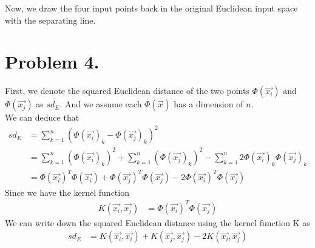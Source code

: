 \documentclass{article}
\begin{document}
    Now, we draw the four input points back in the original Euclidean input space with the separating line.
    \begin{center}
    \end{center}

    \newpage
    \section*{Problem 4.}
    First, we denote the squared Euclidean distance of the two points $\Phi(\overset{\to}{x_i})$ and 
    $\Phi(\overset{\to}{x_j})$ as $sd_E$. And we assume each $\Phi(\overset{\to}{x})$ has a dimension 
    of $n$.\\
    We can deduce that 
    \begin{align*}
        sd_E &= \sum_{k = 1}^{n} (\Phi(\overset{\to}{x_i})_k - \Phi(\overset{\to}{x_j})_k)^2\\
        &= \sum_{k = 1}^{n} (\Phi(\overset{\to}{x_i})_k)^2 + \sum_{k = 1}^{n} (\Phi(\overset{\to}{x_j})_k)^2
        - \sum_{k = 1}^{n} 2 \Phi(\overset{\to}{x_i})_k \Phi(\overset{\to}{x_j})_k\\
        &= \Phi(\overset{\to}{x_i})^T \Phi(\overset{\to}{x_i}) + 
        \Phi(\overset{\to}{x_j})^T \Phi(\overset{\to}{x_j}) - 
        2\Phi(\overset{\to}{x_i})^T \Phi(\overset{\to}{x_j})
    \end{align*}
    Since we have the kernel function
    \begin{align*}
        K(\overset{\to}{x_i}, \overset{\to}{x_j}) &= \Phi(\overset{\to}{x_i})^T \Phi(\overset{\to}{x_j})
    \end{align*}
    We can write down the squared Euclidean distance using the kernel function K as
    \begin{align*}
        sd_E &= K(\overset{\to}{x_i}, \overset{\to}{x_i}) + K(\overset{\to}{x_j}, \overset{\to}{x_j})
        - 2K(\overset{\to}{x_i}, \overset{\to}{x_j})
    \end{align*}
\end{document}
